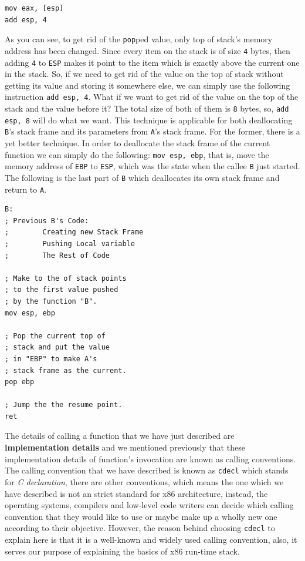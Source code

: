\begin{lstlisting}
mov eax, [esp]
add esp, 4
\end{lstlisting}

As you can see, to get rid of the \lstinline!pop!ped value, only top of
stack's memory address has been changed. Since every item on the stack
is of size \lstinline!4! bytes, then adding \lstinline!4! to
\lstinline!ESP! makes it point to the item which is exactly above the
current one in the stack. So, if we need to get rid of the value on the
top of stack without getting its value and storing it somewhere else, we
can simply use the following instruction \lstinline!add esp, 4!. What if
we want to get rid of the value on the top of the stack and the value
before it? The total size of both of them is \lstinline!8! bytes, so,
\lstinline!add esp, 8! will do what we want. This technique is
applicable for both deallocating \lstinline!B!'s stack frame and its
parameters from \lstinline!A!'s stack frame. For the former, there is a
yet better technique. In order to deallocate the stack frame of the
current function we can simply do the following:
\lstinline!mov esp, ebp!, that is, move the memory address of
\lstinline!EBP! to \lstinline!ESP!, which was the state when the callee
\lstinline!B! just started. The following is the last part of
\lstinline!B! which deallocates its own stack frame and return to
\lstinline!A!.

\begin{lstlisting}
B:
; Previous B's Code:
;        Creating new Stack Frame
;        Pushing Local variable
;        The Rest of Code

; Make to the of stack points
; to the first value pushed
; by the function "B".
mov esp, ebp

; Pop the current top of
; stack and put the value
; in "EBP" to make A's
; stack frame as the current.
pop ebp

; Jump the the resume point.
ret
\end{lstlisting}

The details of calling a function that we have just described are
\textbf{implementation details} and we mentioned previously that these
implementation details of function's invocation are known as calling
conventions. The calling convention that we have described is known as
\lstinline!cdecl! which stands for \emph{C declaration}, there are other
conventions, which means the one which we have described is not an
strict standard for x86 architecture, instead, the operating systems,
compilers and low-level code writers can decide which calling convention
that they would like to use or maybe make up a wholly new one according
to their objective. However, the reason behind choosing
\lstinline!cdecl! to explain here is that it is a well-known and widely
used calling convention, also, it serves our purpose of explaining the
basics of x86 run-time stack.

